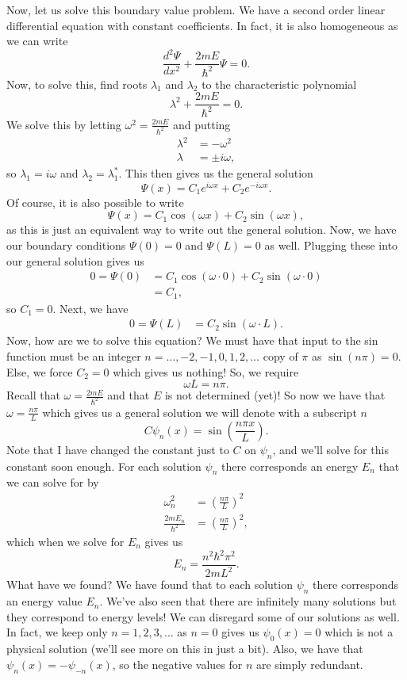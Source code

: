 Now, let us solve this boundary value problem.  We have a second order linear differential equation with constant coefficients. In fact, it is also homogeneous as we can write
\[
\frac{d^2\Psi}{dx^2}+\frac{2mE}{\hbar^2}\Psi =0.
\]
Now, to solve this, find roots $\lambda_1$ and $\lambda_2$ to the characteristic polynomial
\[
\lambda^2+\frac{2mE}{\hbar^2}=0.
\]
We solve this by letting $\omega^2 = \frac{2mE}{\hbar^2}$ and putting
\begin{align*}
    \lambda^2&=-\omega^2\\
    \lambda&=\pm i \omega,
\end{align*}
so $\lambda_1=i\omega$ and $\lambda_2=\lambda_1^*$. This then gives us the general solution
\[
\Psi(x)=C_1 e^{i\omega x}+C_2 e^{-i\omega x}.
\]
Of course, it is also possible to write
\[
\Psi(x)=C_1\cos(\omega x)+C_2\sin(\omega x),
\]
as this is just an equivalent way to write out the general solution. Now, we have our boundary conditions $\Psi(0)=0$ and $\Psi(L)=0$ as well.  Plugging these into our general solution gives us
\begin{align*}
    0=\Psi(0)&=C_1 \cos(\omega \cdot 0)+C_2 \sin(\omega \cdot 0)\\
    &= C_1,
\end{align*}
so $C_1=0$.  Next, we have
\begin{align*}
    0=\Psi(L)&=C_2\sin(\omega \cdot L).
\end{align*}
Now, how are we to solve this equation? We must have that input to the sin function must be an integer $n=\dots,-2,-1,0,1,2,\dots$ copy of $\pi$ as $\sin(n\pi)=0$. Else, we force $C_2=0$ which gives us nothing!  So, we require
\[
\omega L = n\pi.
\]
Recall that $\omega = \frac{2mE}{\hbar^2}$ and that $E$ is not determined (yet)! So now we have that $\omega = \frac{n\pi}{L}$ which gives us a general solution we will denote with a subscript $n$
\[
C\psi_n(x)=\sin\left(\frac{n\pi x}{L}\right).
\]
Note that I have changed the constant just to $C$ on $\psi_n$, and we'll solve for this constant soon enough.  For each solution $\psi_n$ there corresponds an energy $E_n$ that we can solve for by
\begin{align*}
    \omega_n^2  &= \left(\frac{n \pi}{L}\right)^2\\
    \frac{2mE_n}{\hbar^2}&= \left(\frac{n\pi}{L}\right)^2,
\end{align*}
which when we solve for $E_n$ gives us
\[
   \boxed{E_n = \frac{n^2\hbar^2\pi^2}{2mL^2}.}
\]
What have we found? We have found that to each solution $\psi_n$ there corresponds an energy value $E_n$. We've also seen that there are infinitely many solutions but they correspond to  energy levels! We can disregard some of our solutions as well. In fact, we keep only $n=1,2,3,\dots$ as $n=0$ gives us $\psi_0(x)=0$ which is not a physical solution (we'll see more on this in just a bit).  Also, we have that $\psi_n(x)=-\psi_{-n}(x)$, so the negative values for $n$ are simply redundant.

